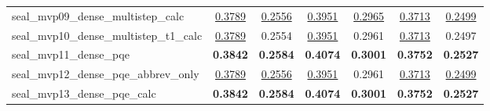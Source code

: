 \begin{tabular}{lcccccc}
seal_mvp09_dense_multistep_calc & \underline{0.3789} & \underline{0.2556} & \underline{0.3951} & \underline{0.2965} & \underline{0.3713} & \underline{0.2499} \\
seal_mvp10_dense_multistep_t1_calc & \underline{0.3789} & 0.2554 & \underline{0.3951} & 0.2961 & \underline{0.3713} & 0.2497 \\
seal_mvp11_dense_pqe & \textbf{0.3842} & \textbf{0.2584} & \textbf{0.4074} & \textbf{0.3001} & \textbf{0.3752} & \textbf{0.2527} \\
seal_mvp12_dense_pqe_abbrev_only & \underline{0.3789} & \underline{0.2556} & \underline{0.3951} & 0.2961 & \underline{0.3713} & \underline{0.2499} \\
seal_mvp13_dense_pqe_calc & \textbf{0.3842} & \textbf{0.2584} & \textbf{0.4074} & \textbf{0.3001} & \textbf{0.3752} & \textbf{0.2527} \\
\bottomrule
\end{tabular}

